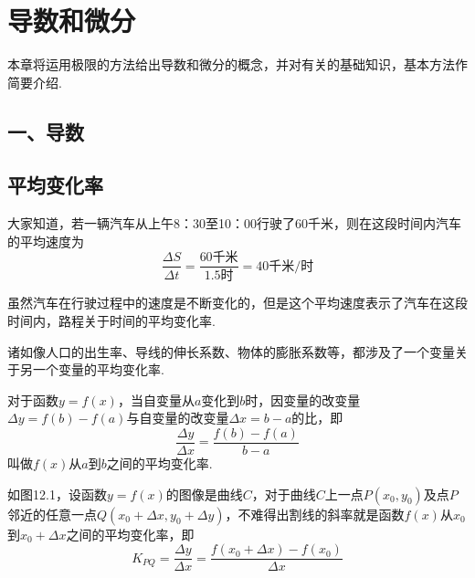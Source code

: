 \chapter{导数和微分}
本章将运用极限的方法给出导数和微分的概念，并对有关的基础知识，基本方法作简要介绍.

\section*{一、导数}

\section{平均变化率}

大家知道，若一辆汽车从上午8：30至10：00行驶了60千米，则在这段时间内汽车的平均速度为
\[\frac{\Delta S}{\Delta t}=\frac{60\text{千米}}{1.5\text{时}}=40\text{千米}/\text{时}\]

虽然汽车在行驶过程中的速度是不断变化的，但是这个平均速度表示了汽车在这段时间内，路程关于时间的平均变化率.

\noindent
\begin{minipage}{.48\textwidth}
    \CTEXindent
诸如像人口的出生率、导线的伸长系数、物体的膨胀系数等，都涉及了一个变量关于另一个变量的平均变化率.

对于函数$y=f(x)$，当自变量从$a$变化到$b$时，因变量的改变量$\Delta y=f(b)-f(a)$与自变量的改变量$\Delta x=b-a$的比，即
\[\frac{\Delta y}{\Delta x}=\frac{f(b)-f(a)}{b-a}\]
叫做$f(x)$从$a$到$b$之间的平均变化率.
\end{minipage}
\hfill
\begin{minipage}{.48\textwidth}
    \centering
{}
\end{minipage}

如图12.1，设函数$y=f(x)$的图像是曲线$C$，对于曲线$C$上一点$P(x_0,y_0)$及点$P$邻近的任意一点$Q(x_0+\Delta x,y_0+\Delta y)$，不难得出割线的斜率就是函数$f(x)$从$x_0$到$x_0+\Delta x$之间的平均变化率，即    
\[K_{PQ}=\frac{\Delta y}{\Delta x}=\frac{f(x_0+\Delta x)-f(x_0)}{\Delta x}\]


